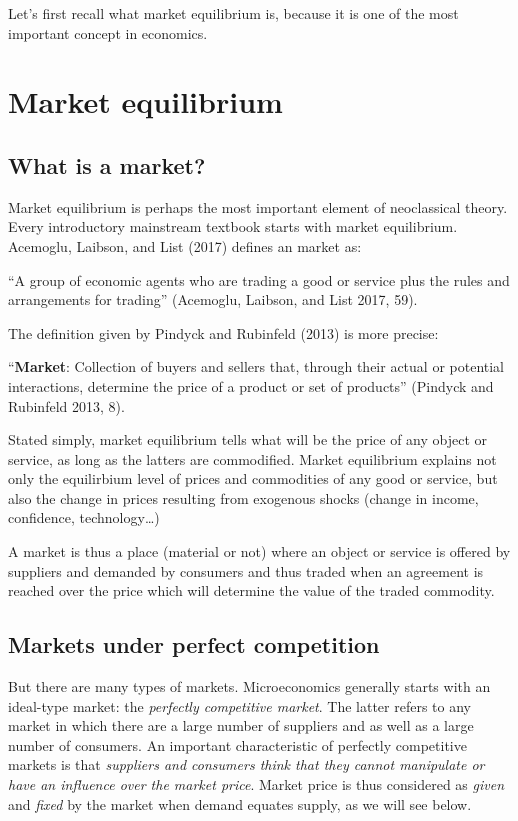 \documentclass[
  letterpaper,
  DIV=11,
  numbers=noendperiod]{scrreprt}
\begin{document}
Let's first recall what market equilibrium is, because it is one of the
most important concept in economics.

\hypertarget{market-equilibrium}{%
\section{Market equilibrium}\label{market-equilibrium}}

\hypertarget{what-is-a-market}{%
\subsection{What is a market?}\label{what-is-a-market}}

Market equilibrium is perhaps the most important element of neoclassical
theory. Every introductory mainstream textbook starts with market
equilibrium. Acemoglu, Laibson, and List (2017) defines an market as:

``A group of economic agents who are trading a good or service plus the
rules and arrangements for trading'' (Acemoglu, Laibson, and List 2017,
59).

The definition given by Pindyck and Rubinfeld (2013) is more precise:

``\textbf{Market}: Collection of buyers and sellers that, through their
actual or potential interactions, determine the price of a product or
set of products'' (Pindyck and Rubinfeld 2013, 8).

Stated simply, market equilibrium tells what will be the price of any
object or service, as long as the latters are commodified. Market
equilibrium explains not only the equilirbium level of prices and
commodities of any good or service, but also the change in prices
resulting from exogenous shocks (change in income, confidence,
technology\ldots)

A market is thus a place (material or not) where an object or service is
offered by suppliers and demanded by consumers and thus traded when an
agreement is reached over the price which will determine the value of
the traded commodity.

\hypertarget{markets-under-perfect-competition}{%
\subsection{Markets under perfect
competition}\label{markets-under-perfect-competition}}

But there are many types of markets. Microeconomics generally starts
with an ideal-type market: the \emph{perfectly competitive market}. The
latter refers to any market in which there are a large number of
suppliers and as well as a large number of consumers. An important
characteristic of perfectly competitive markets is that \emph{suppliers
and consumers think that they cannot manipulate or have an influence
over the market price}. Market price is thus considered as \emph{given}
and \emph{fixed} by the market when demand equates supply, as we will
see below.
\end{document}
